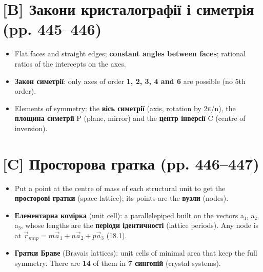 \documentclass[11pt,a4paper,oneside]{book}
\begin{document}
\section*{[B] Закони кристалографії і симетрія (pp. 445–446)}
\begin{itemize}
\item Flat faces and straight edges; \textbf{constant angles between faces}; rational ratios of the intercepts on the axes.
\item \textbf{Закон симетрії}: only axes of order \textbf{1, 2, 3, 4 and 6} are possible (no 5th order).
\item Elements of symmetry: the \textbf{вісь симетрії} (axis, rotation by 2π/n), the \textbf{площина симетрії} P (plane, mirror) and the \textbf{центр інверсії} C (centre of inversion).
\end{itemize}

\section*{[C] Просторова гратка (pp. 446–447)}
\begin{itemize}
\item Put a point at the centre of mass of each structural unit to get the \textbf{просторові гратки} (space lattice); its points are the \textbf{вузли} (nodes).
\item \textbf{Елементарна комірка} (unit cell): a parallelepiped built on the vectors a₁, a₂, a₃, whose lengths are the \textbf{періоди ідентичності} (lattice periods). Any node is at $\vec r_{mnp} = m\vec a_1 + n\vec a_2 + p\vec a_3$ (18.1).
\item \textbf{Гратки Браве} (Bravais lattices): unit cells of minimal area that keep the full symmetry. There are \textbf{14} of them in \textbf{7 сингоній} (crystal systems).
\end{itemize}
\end{document}
